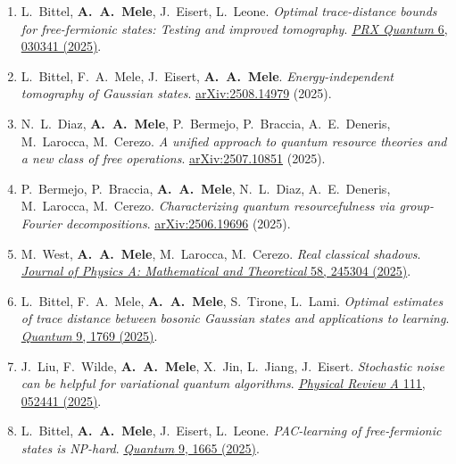 \documentclass[11pt,a4paper]{article}
\newcommand{\cvpubitem}[1]{\item #1}
\begin{document}
\begin{enumerate}
\cvpubitem{L.~Bittel, \textbf{A.~A.~Mele}, J.~Eisert, L.~Leone.
\emph{Optimal trace-distance bounds for free-fermionic states: Testing and improved tomography}.
\href{https://doi.org/10.1103/pzx6-nkfb}{\textit{PRX Quantum} 6, 030341 (2025)}.}

\cvpubitem{L.~Bittel, F.~A.~Mele, J.~Eisert, \textbf{A.~A.~Mele}.
\emph{Energy-independent tomography of Gaussian states}.
\href{https://arxiv.org/abs/2508.14979}{arXiv:2508.14979} (2025).}

\cvpubitem{N.~L.~Diaz, \textbf{A.~A.~Mele}, P.~Bermejo, P.~Braccia, A.~E.~Deneris, M.~Larocca, M.~Cerezo.
\emph{A unified approach to quantum resource theories and a new class of free operations}.
\href{https://arxiv.org/abs/2507.10851}{arXiv:2507.10851} (2025).}

\cvpubitem{P.~Bermejo, P.~Braccia, \textbf{A.~A.~Mele}, N.~L.~Diaz, A.~E.~Deneris, M.~Larocca, M.~Cerezo.
\emph{Characterizing quantum resourcefulness via group-Fourier decompositions}.
\href{https://arxiv.org/abs/2506.19696}{arXiv:2506.19696} (2025).}

\cvpubitem{M.~West, \textbf{A.~A.~Mele}, M.~Larocca, M.~Cerezo.
\emph{Real classical shadows}.
\href{https://doi.org/10.1088/1751-8121/addfc2}{\textit{Journal of Physics A: Mathematical and Theoretical} 58, 245304 (2025)}.}

\cvpubitem{L.~Bittel, F.~A.~Mele, \textbf{A.~A.~Mele}, S.~Tirone, L.~Lami.
\emph{Optimal estimates of trace distance between bosonic Gaussian states and applications to learning}.
\href{https://quantum-journal.org/papers/q-2025-06-12-1769/}{\textit{Quantum} 9, 1769 (2025)}.}

\cvpubitem{J.~Liu, F.~Wilde, \textbf{A.~A.~Mele}, X.~Jin, L.~Jiang, J.~Eisert.
\emph{Stochastic noise can be helpful for variational quantum algorithms}.
\href{https://doi.org/10.1103/PhysRevA.111.052441}{\textit{Physical Review A} 111, 052441 (2025)}.}

\cvpubitem{L.~Bittel, \textbf{A.~A.~Mele}, J.~Eisert, L.~Leone.
\emph{PAC-learning of free-fermionic states is NP-hard}.
\href{https://quantum-journal.org/papers/q-2025-03-20-1665/}{\textit{Quantum} 9, 1665 (2025)}.}


\end{enumerate}
\end{document}
